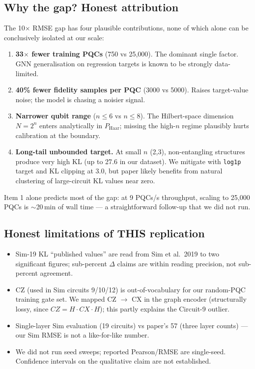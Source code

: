 \documentclass[11pt]{article}
\begin{document}
\subsection{Why the gap? Honest attribution}
The 10\(\times\) RMSE gap has four plausible contributions, none of which
alone can be conclusively isolated at our scale:
\begin{enumerate}
  \item \textbf{33\(\times\) fewer training PQCs} (750 vs 25{,}000). The
    dominant single factor. GNN generalisation on regression targets is
    known to be strongly data-limited.
  \item \textbf{40\% fewer fidelity samples per PQC} (3000 vs 5000). Raises
    target-value noise; the model is chasing a noisier signal.
  \item \textbf{Narrower qubit range} (\(n\!\le\!6\) vs \(n\!\le\!8\)). The
    Hilbert-space dimension \(N\!=\!2^n\) enters analytically in
    \(P_{\mathrm{Haar}}\); missing the high-\(n\) regime plausibly hurts
    calibration at the boundary.
  \item \textbf{Long-tail unbounded target.} At small \(n\) (2,3),
    non-entangling structures produce very high KL (up to 27.6 in our
    dataset). We mitigate with \verb|log1p| target and KL clipping at 3.0,
    but paper likely benefits from natural clustering of large-circuit
    KL values near zero.
\end{enumerate}
Item 1 alone predicts most of the gap: at 9 PQCs/s throughput, scaling to
25{,}000 PQCs is \(\sim\)20\,min of wall time --- a straightforward
follow-up that we did not run.

\subsection{Honest limitations of THIS replication}
\begin{itemize}
  \item Sim-19 KL ``published values'' are read from Sim et al.\ 2019 to
    two significant figures; sub-percent \(\Delta\) claims are within
    reading precision, not sub-percent agreement.
  \item CZ (used in Sim circuits 9/10/12) is out-of-vocabulary for our
    random-PQC training gate set. We mapped CZ \(\to\) CX in the graph
    encoder (structurally lossy, since \(CZ = H\cdot CX\cdot H\)); this
    partly explains the Circuit-9 outlier.
  \item Single-layer Sim evaluation (19 circuits) vs paper's 57 (three
    layer counts) --- our Sim RMSE is not a like-for-like number.
  \item We did not run seed sweeps; reported Pearson/RMSE are single-seed.
    Confidence intervals on the qualitative claim are not established.
\end{itemize}
\end{document}

